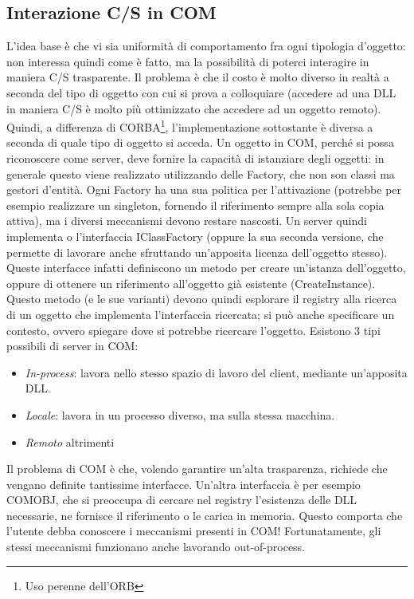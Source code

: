 \subsection{Interazione C/S in COM}
L'idea base è che vi sia uniformità di comportamento fra ogni tipologia d'oggetto: non interessa quindi come è fatto, ma
la possibilità di poterci interagire in maniera C/S trasparente. Il problema è che il costo è molto diverso in realtà a
seconda del tipo di oggetto con cui si prova a colloquiare (accedere ad una DLL in maniera C/S è molto più ottimizzato
che accedere ad un oggetto remoto).
Quindi, a differenza di CORBA\footnote{Uso perenne dell'ORB}, l'implementazione sottostante è diversa a seconda di quale
tipo di oggetto si acceda. Un oggetto in COM, perché si possa riconoscere come server, deve fornire la capacità di
istanziare degli oggetti: in generale questo viene realizzato utilizzando delle Factory, che non son classi ma gestori
d'entità. Ogni Factory ha una sua politica per l'attivazione (potrebbe per esempio realizzare un singleton, fornendo il
riferimento sempre alla sola copia attiva), ma i diversi meccanismi devono restare nascosti.
Un server quindi implementa o l'interfaccia IClassFactory (oppure la sua seconda versione, che permette di lavorare
anche sfruttando un'apposita licenza dell'oggetto stesso). Queste interfacce infatti definiscono un metodo per creare
un'istanza dell'oggetto, oppure di ottenere un riferimento all'oggetto già esistente (CreateInstance). Questo metodo (e
le sue varianti) devono quindi esplorare il registry alla ricerca di un oggetto che implementa l'interfaccia ricercata;
si può anche specificare un contesto, ovvero spiegare dove si potrebbe ricercare l'oggetto.
Esistono 3 tipi possibili di server in COM:
\begin{itemize}
 \item \textit{In-process}: lavora nello stesso spazio di lavoro del client, mediante un'apposita DLL.
 \item \textit{Locale}: lavora in un processo diverso, ma sulla stessa macchina.
 \item \textit{Remoto} altrimenti
\end{itemize}
Il problema di COM è che, volendo garantire un'alta trasparenza, richiede che vengano definite tantissime interfacce.
Un'altra interfaccia è per esempio COMOBJ, che si preoccupa di cercare nel registry l'esistenza delle DLL necessarie,
ne fornisce il riferimento o le carica in memoria. Questo comporta che l'utente debba conoscere i meccanismi presenti
in COM! Fortunatamente, gli stessi meccanismi funzionano anche lavorando out-of-process.
